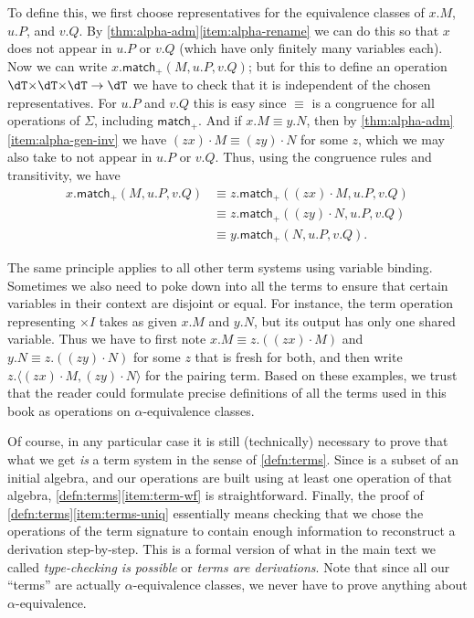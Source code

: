 \documentclass{book}
\def\sig{\Sigma}
\def\timesI{\ensuremath{\mathord{\times}I}}
\def\pair#1#2{\langle #1,#2\rangle}
\def\case{\mathsf{match}_+}
\begin{document}
To define this, we first choose representatives for the equivalence classes of $x.M$, $u.P$, and $v.Q$.
By \cref{thm:alpha-adm}\ref{item:alpha-rename} we can do this so that $x$ does not appear in $u.P$ or $v.Q$ (which have only finitely many variables each).
Now we can write $x.\case(M,u.P,v.Q)$; but for this to define an operation $\dT\times \dT\times \dT \to \dT$ we have to check that it is independent of the chosen representatives.
For $u.P$ and $v.Q$ this is easy since $\equiv$ is a congruence for all operations of $\sig$, including $\case$.
And if $x.M\equiv y.N$, then by \cref{thm:alpha-adm}\ref{item:alpha-gen-inv} we have $(zx)\cdot M \equiv (zy)\cdot N$ for some $z$, which we may also take to not appear in $u.P$ or $v.Q$.
Thus, using the congruence rules and transitivity, we have
\begin{align*}
  x. \case(M,u.P,v.Q)
  &\equiv z.\case((zx)\cdot M,u.P,v.Q)\\
  &\equiv z.\case((zy)\cdot N,u.P,v.Q)\\
  &\equiv y.\case(N,u.P,v.Q).
\end{align*}

The same principle applies to all other term systems using variable binding.
Sometimes we also need to poke down into all the terms to ensure that certain variables in their context are disjoint or equal.
For instance, the term operation representing $\timesI$ takes as given $x.M$ and $y.N$, but its output has only one shared variable.
Thus we have to first note $x.M \equiv z.((zx)\cdot M)$ and $y.N \equiv z.((zy)\cdot N)$ for some $z$ that is fresh for both, and then write $z.\pair{(zx)\cdot M}{(zy)\cdot N}$ for the pairing term.
Based on these examples, we trust that the reader could formulate precise definitions of all the terms used in this book as operations on $\alpha$-equivalence classes.

Of course, in any particular case it is still (technically) necessary to prove that what we get \emph{is} a term system in the sense of \cref{defn:terms}.
Since \dT is a subset of an initial algebra, and our operations are built using at least one operation of that algebra, \ref{defn:terms}\ref{item:term-wf} is straightforward.
Finally, the proof of \ref{defn:terms}\ref{item:terms-uniq} essentially means checking that we chose the operations of the term signature to contain enough information to reconstruct a derivation step-by-step.
This is a formal version of what in the main text we called \emph{type-checking is possible} or \emph{terms are derivations}.
Note that since all our ``terms'' are actually $\alpha$-equivalence classes, we never have to prove anything about $\alpha$-equivalence.





\end{document}
